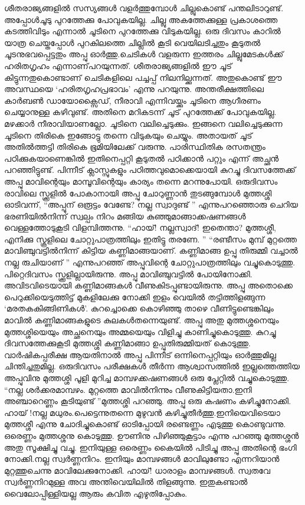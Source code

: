 ശീതരാജ്യങ്ങളിൽ സസ്യങ്ങൾ വളർത്തുമ്പോൾ ചില്ലുകൊണ്ട് പന്തലിടാറുണ്ട്. അപ്പോൾചൂടു പുറത്തേക്കു പോവുകയില്ല. ചില്ലു അകത്തേക്കുള്ള പ്രകാശത്തെ കടത്തിവിടും എന്നാൽ ചൂടിനെ പുറത്തേക്കു വിടുകയില്ല. ഒരു ദിവസം കാറിൽ യാത്ര ചെയ്തപ്പോൾ പുറകിലത്തെ ചില്ലിൽ കൂടി വെയിലടിച്ചതും കൂടുതൽ ചൂടനുഭവപ്പെട്ടതും അപ്പു ഓർത്തു.ചെടികൾ വളരുന്ന ഇത്തരം ചില്ലുമേടകൾക്ക് ഹരിതഗൃഹം എന്നാണ്‌പറയുന്നത്. ശീതരാജ്യങ്ങളിൽ ഈ ചൂട് കിട്ടുന്നതുകൊണ്ടാണ്‌ ചെടികളിലെ പച്ചപ്പ് നിലനില്ക്കുന്നത്. അതുകൊണ്ട് ഈ അവസ്ഥയെ ‘ഹരിതഗൃഹപ്രഭാവം’ എന്നു പറയുന്നു. അന്തരീക്ഷത്തിലെ കാർബൺ ഡായോക്സൈഡ്, നീരാവി എന്നിവയ്ക്കും ചൂടിനെ ആഗീരണം ചെയ്യാനുള്ള കഴിവുണ്ട്. അതിനെ മറികടന്ന് ചൂട് പുറത്തേക്ക് പോവുകയില്ല. മഴക്കാർ നീരാവിയാണല്ലോ. ചൂടിനെ വലിച്ചെടുക്കും. ഇങ്ങനെ വലിച്ചെടുക്കുന്ന ചൂടിനെ തിരികെ ഇങ്ങോട്ടു തന്നെ വിടുകയും ചെയ്യും. അതായത് ചൂട് അതിൽത്തട്ടി തിരികെ ഭൂമിയിലേക്ക് വരുന്നു. പാരിസ്ഥിതിക രസതന്ത്രം പഠിക്കുകയാണെങ്കിൽ ഇതിനെപ്പറ്റി കൂടുതൽ പഠിക്കാൻ പറ്റും എന്ന് അച്ഛൻ പറഞ്ഞിട്ടുണ്ട്. പിന്നീട് ക്ലാസ്സുകളും പഠിത്തവുമൊക്കെയായി കുറച്ചു ദിവസത്തേക്ക് അപ്പു മാവിന്റെയും മാമ്പൂവിന്റെയും കാര്യം തന്നെ മറന്നുപോയി.
ഒരുദിവസം രാവിലെ സ്ക്കൂളിൽ പോകാനായി അപ്പു ചോറുണ്ണാൻ തുടങ്ങുമ്പോൾ മുത്തശ്ശി ഓടിവന്ന്, ``അപ്പൂന്‌ ഒരൂട്ടം വേണ്ടേ? നല്ല സ്വാദുണ്ട് '' എന്നുപറഞ്ഞൊരു ചെറിയ ഭരണിയിൽനിന്ന് സ്വല്പം നിറം മങ്ങിയ കുഞ്ഞുമാങ്ങാക്കഷണങ്ങൾ വെള്ളത്തോടുകൂടി വിളമ്പിത്തന്നു.
``ഹായ്! നല്ലസ്വാദ്! ഇതെന്താ? മുത്തശ്ശീ, എനിക്കു സ്കൂളിലെ ചോറ്റുപാത്രത്തിലും ഇതിട്ടു തരണേ. ''
``രണ്ടീസം മുമ്പ് മുറ്റത്തെ മാവിഞ്ചുവട്ടിൽനിന്ന് കിട്ടിയ കണ്ണിമാങ്ങയാണ്‌. കണ്ണിമാങ്ങ ഉപ്പു തിരുമ്മി വച്ചാൽ നല്ല രുചിയാണ്‌ '' എന്നുപറഞ്ഞ് അപ്പുവിന്റെ ചോറ്റുപാത്രത്തിലും വച്ചുകൊടുത്തു.
പിറ്റെദിവസം സ്ക്കൂളില്ലായിരുന്നു. അപ്പു മാവിഞ്ചുവട്ടിൽ പോയിനോക്കി. അവിടവിടെയായി കണ്ണിമാങ്ങകൾ വീണുകിടപ്പുണ്ടായിരുന്നു. അപ്പു അതൊക്കെ പെറുക്കിയെടുത്തിട്ട് മുകളിലേക്കു നോക്കി ഇളം വെയിൽ തട്ടിത്തിളങ്ങുന്ന ‘മരതകകിങ്ങിണികൾ’. കുറച്ചൊക്കെ കൊഴിഞ്ഞു താഴെ വീണിട്ടുണ്ടെങ്കിലും മാവിൽ കണ്ണിമാങ്ങകളുടെ കുലകൾതന്നെയുണ്ട്. അപ്പു അതു മുത്തശ്ശനെയും മുത്തശ്ശിയെയും അച്ഛനെയും അമ്മയെയും വിളിച്ചു കാണിച്ചുകൊടുത്തു.
കുറച്ചു ദിവസത്തേക്കുകൂടി മുത്തശ്ശി കണ്ണിമാങ്ങാ ഉപ്പുതിരുമ്മിയത് കൊടുത്തു. വാർഷികപ്പരീക്ഷ ആയതിനാൽ അപ്പു പിന്നീട് ഒന്നിനെപ്പറ്റിയും ഓർത്തുമില്ല ചിന്തിച്ചതുമില്ല.
ഒരുദിവസം പരീക്ഷകൾ തീർന്ന ആശ്വാസത്തിൽ ഇല്ലത്തെത്തിയ അപ്പുവിനു മുത്തശ്ശി പൂളി മുറിച്ച മാമ്പഴക്കഷണങ്ങൾ ഒരു പ്ലേറ്റിൽ വച്ചുകൊടുത്തു. ``നല്ല ശർക്കരമാമ്പഴം. മുറ്റത്തെ മാവിൽനിന്നും വീണുകിട്ടിയതാ.ഇനി അഞ്ചാറെണ്ണം കൂടിയുണ്ട് ''മുത്തശ്ശി പറഞ്ഞു.
അപ്പു ഒരു കഷണം കഴിച്ചുനോക്കി. ഹായ് !നല്ല മധുരം.പെട്ടെന്നുതന്നെ മുഴുവൻ കഴിച്ചുതീർത്തു.ഇനിയെവിടെയാ മുത്തശ്ശീ എന്നു ചോദിച്ചുകൊണ്ട് ഓടിപ്പോയി രണ്ടെണ്ണം എടുത്തു കൊണ്ടുവന്നു. ഒരെണ്ണം മുത്തശ്ശനു കൊടുത്തു. ഊണിനു പിഴിഞ്ഞുകൂട്ടാം എന്നു പറഞ്ഞു മുത്തശ്ശൻ അതു സൂക്ഷിച്ചു വച്ചു. ഇനിയുള്ള ഒരെണ്ണം കൈയിൽ പിടിച്ചു അപ്പു അതിന്റെ ഭംഗി നോക്കി.നല്ല സ്വർണ്ണനിറം. ഇനിയും മാമ്പഴങ്ങൾ മാവിലുണ്ടോ എന്നറിയാൻ മുറ്റത്തുചെന്നു മാവിലേക്കുനോക്കി. ഹായ്! ധാരാളം മാമ്പഴങ്ങൾ. സ്വതവേ സ്വർണ്ണനിറമുള്ള അവ അന്തിവെയിലിൽ തിളങ്ങുന്നു. ഇതുകണ്ടാൽ വൈലോപ്പിള്ളിയല്ല ആരും കവിത എഴുതിപ്പോകും.
